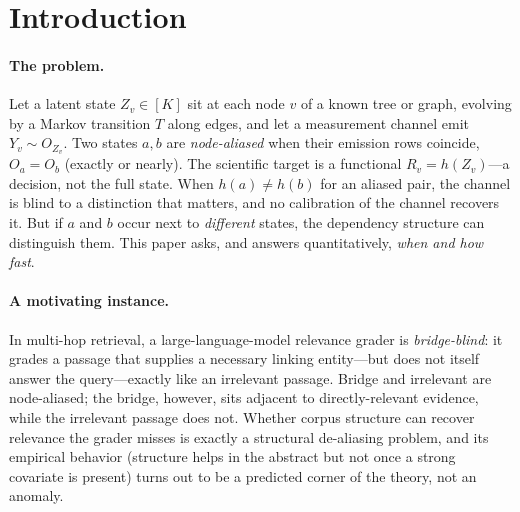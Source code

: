 \documentclass[11pt]{article}
\theoremstyle{plain}
\theoremstyle{definition}\newtheorem{definition}{Definition}\newtheorem{assumption}{Assumption}
\begin{document}
\section{Introduction}
\paragraph{The problem.} Let a latent state $Z_v\in[K]$ sit at each node $v$ of a known tree or graph, evolving by
a Markov transition $T$ along edges, and let a measurement channel emit $Y_v\sim O_{Z_v}$. Two states $a,b$ are
\emph{node-aliased} when their emission rows coincide, $O_a=O_b$ (exactly or nearly). The scientific target is a
functional $R_v=h(Z_v)$---a decision, not the full state. When $h(a)\neq h(b)$ for an aliased pair, the channel is
blind to a distinction that matters, and no calibration of the channel recovers it. But if $a$ and $b$ occur next
to \emph{different} states, the dependency structure can distinguish them. This paper asks, and answers
quantitatively, \emph{when and how fast}.

\paragraph{A motivating instance.} In multi-hop retrieval, a large-language-model relevance grader is
\emph{bridge-blind}: it grades a passage that supplies a necessary linking entity---but does not itself answer the
query---exactly like an irrelevant passage. Bridge and irrelevant are node-aliased; the bridge, however, sits
adjacent to directly-relevant evidence, while the irrelevant passage does not. Whether corpus structure can
recover relevance the grader misses is exactly a structural de-aliasing problem, and its empirical behavior
(structure helps in the abstract but not once a strong covariate is present) turns out to be a predicted corner of
the theory, not an anomaly.
\end{document}
